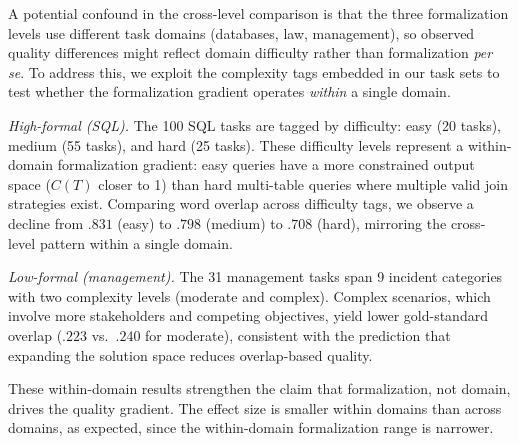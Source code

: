 \documentclass[runningheads]{llncs}
\begin{document}
A potential confound in the cross-level comparison is that the three formalization levels use different task domains (databases, law, management), so observed quality differences might reflect domain difficulty rather than formalization \textit{per se}. To address this, we exploit the complexity tags embedded in our task sets to test whether the formalization gradient operates \emph{within} a single domain.

\vspace{5pt}
\noindent
\textit{High-formal (SQL).}
The 100 SQL tasks are tagged by difficulty: easy (20 tasks), medium (55 tasks), and hard (25 tasks). These difficulty levels represent a within-domain formalization gradient: easy queries have a more constrained output space ($C(T)$ closer to 1) than hard multi-table queries where multiple valid join strategies exist. Comparing word overlap across difficulty tags, we observe a decline from $.831$ (easy) to $.798$ (medium) to $.708$ (hard), mirroring the cross-level pattern within a single domain.

\vspace{5pt}
\noindent
\textit{Low-formal (management).}
The 31 management tasks span 9 incident categories with two complexity levels (moderate and complex). Complex scenarios, which involve more stakeholders and competing objectives, yield lower gold-standard overlap ($.223$ vs.\ $.240$ for moderate), consistent with the prediction that expanding the solution space reduces overlap-based quality.

These within-domain results strengthen the claim that formalization, not domain, drives the quality gradient. The effect size is smaller within domains than across domains, as expected, since the within-domain formalization range is narrower.


\end{document}
